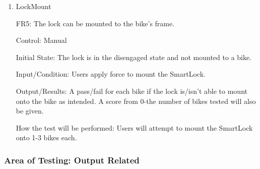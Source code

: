 \documentclass[12pt, titlepage]{article}
\begin{document}
\begin{enumerate}

\item{LockMount

FR5: The lock can be mounted to the bike’s frame. }

Control: Manual

Initial State: The lock is in the disengaged state and not mounted to a bike.

Input/Condition: Users apply force to mount the SmartLock.

Output/Results: A pass/fail for each bike if the lock is/isn’t able to mount onto the bike as intended. A score from 0-the number of bikes tested will also be given.

How the test will be performed: Users will attempt to mount the SmartLock onto 1-3 bikes each.

\end{enumerate}

\subsubsection{Area of Testing: Output Related}
\end{document}
